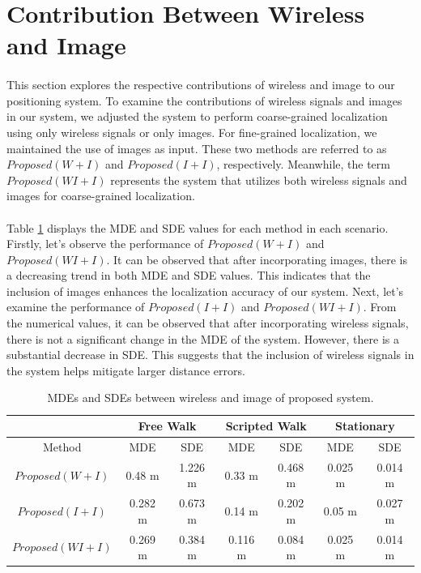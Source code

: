 \documentclass[a4paper,12pt]{report}
\begin{document}
\section{Contribution Between Wireless and Image}
\paragraph{}
This section explores the respective contributions of wireless and image to our positioning system.  To examine the contributions of wireless signals and images in our system, we adjusted the system to perform coarse-grained localization using only wireless signals or only images. For fine-grained localization, we maintained the use of images as input. These two methods are referred to as $Proposed(W+I)$ and $Proposed(I+I)$, respectively. Meanwhile, the term $Proposed(WI+I)$ represents the system that utilizes both wireless signals and images for coarse-grained localization.
\paragraph{}
Table \ref{table:5_3_MDEnSDE} displays the MDE and SDE values for each method in each scenario. Firstly, let's observe the performance of $Proposed(W+I)$ and $Proposed(WI+I)$. It can be observed that after incorporating images, there is a decreasing trend in both MDE and SDE values. This indicates that the inclusion of images enhances the localization accuracy of our system. Next, let's examine the performance of $Proposed (I+I)$ and $Proposed (WI+I)$. From the numerical values, it can be observed that after incorporating wireless signals, there is not a significant change in the MDE of the system. However, there is a substantial decrease in SDE. This suggests that the inclusion of wireless signals in the system helps mitigate larger distance errors.
\begin{table}[h]
    \begin{center}
    \caption{MDEs and SDEs between wireless and image of proposed system.}
    \label{table:5_3_MDEnSDE}
        \begin{tabular}{|c||c|c|c|c|c|c|}
            \hline
                & \multicolumn{2}{|c|}{Free Walk} & \multicolumn{2}{|c|}{Scripted Walk} & \multicolumn{2}{|c|}{Stationary}\\
            \hline
                Method & MDE & SDE & MDE & SDE & MDE & SDE \\
            \hline
            \hline
                $Proposed(W+I)$ & 0.48 m  & 1.226 m  & 0.33 m & 0.468 m & 0.025 m & 0.014 m \\
            \hline
                $Proposed(I+I)$   & 0.282 m  & 0.673 m  & 0.14 m & 0.202 m & 0.05 m & 0.027 m\\
            \hline
                $Proposed(WI+I)$    & 0.269 m & 0.384 m & 0.116 m & 0.084 m & 0.025 m & 0.014 m\\
            \hline
        \end{tabular}
    \end{center}
\end{table}
\end{document}
